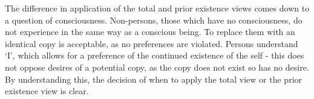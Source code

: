 \documentclass[12pt]{article}
\begin{document}
The difference in application of the total and prior existence views comes down to a question of consciousness. Non-persons, those which have no consciousness, do not experience in the same way as a conscious being. To replace them with an identical copy is acceptable, as no preferences are violated. Persons understand `I', which allows for a preference of the continued existence of the self - this does not oppose desires of a potential copy, as the copy does not exist so has no desire. By understanding this, the decision of when to apply the total view or the prior existence view is clear.
\end{document}

